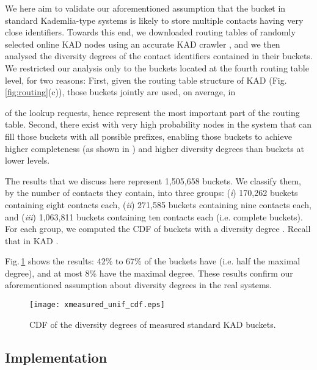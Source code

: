 \documentclass[10pt, conference, compsocconf, letterpaper]{IEEEtran}
\begin{document}
We here aim to validate our aforementioned assumption that the bucket in standard Kademlia-type systems is likely to store multiple contacts having very close identifiers.   
Towards this end, we downloaded routing tables of randomly selected online KAD nodes using an accurate KAD crawler \cite{salah13capturing}, and we then analysed the diversity degrees of the contact identifiers contained in their buckets. We restricted our analysis only to the buckets located at the fourth routing table level, for two reasons: First, given the routing table structure of KAD (Fig.\,\ref{fig:routing}(c)), those buckets jointly are used, on average, in \begin{footnotesize}\end{footnotesize} of the lookup requests, hence represent the most important part of the routing table.
Second, there exist with very high probability nodes in the system that can fill those buckets with all possible prefixes, enabling those buckets to achieve higher completeness (as shown in \cite{stutzbach06improving}) and higher diversity degrees than buckets at lower levels. 

The results that we discuss here represent 1,505,658 buckets. We classify them, by the number of contacts they contain, into three groups: (\emph{i}) 170,262 buckets containing eight contacts each, (\emph{ii}) 271,585 buckets containing nine contacts each, and (\emph{iii}) 1,063,811 buckets containing ten contacts each (i.e. complete buckets). For each group, we computed the CDF of buckets with a diversity degree . Recall that in KAD . 

Fig.\,\ref{fig:measured_unif_cdf} shows the results: 42\% to 67\% of the buckets have  (i.e. half the maximal degree), and at most 8\% have the maximal degree. These results confirm our aforementioned assumption about diversity degrees in the real systems.

\begin{figure} \centering
\captionsetup{font=scriptsize}
   \texttt{[image: xmeasured\_unif\_cdf.eps]}
   \caption{CDF of the diversity degrees of measured standard KAD buckets.}
   \label{fig:measured_unif_cdf}
\end{figure}

\subsection{Implementation} \label{subsec:increasing}
\end{document}
